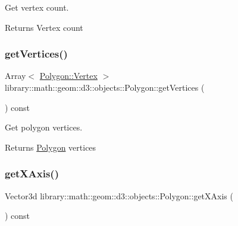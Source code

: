 Get vertex count. 

\begin{DoxyReturn}{Returns}
Vertex count 
\end{DoxyReturn}
\mbox{\label{classlibrary_1_1math_1_1geom_1_1d3_1_1objects_1_1_polygon_a6df2edc6429946ebd7b9e96524d725fa}} 
\subsubsection{\texorpdfstring{get\+Vertices()}{getVertices()}}
{\footnotesize\ttfamily Array$<$ \hyperlink{classlibrary_1_1math_1_1geom_1_1d3_1_1objects_1_1_polygon_a12c41d13f2128442c1a15b9eaa08e1d0}{Polygon\+::\+Vertex} $>$ library\+::math\+::geom\+::d3\+::objects\+::\+Polygon\+::get\+Vertices (\begin{DoxyParamCaption}{ }\end{DoxyParamCaption}) const}



Get polygon vertices. 

\begin{DoxyReturn}{Returns}
\hyperlink{classlibrary_1_1math_1_1geom_1_1d3_1_1objects_1_1_polygon}{Polygon} vertices 
\end{DoxyReturn}
\mbox{\label{classlibrary_1_1math_1_1geom_1_1d3_1_1objects_1_1_polygon_a1d16c3229601acc55e9ad25510f821e2}} 
\subsubsection{\texorpdfstring{get\+X\+Axis()}{getXAxis()}}
{\footnotesize\ttfamily Vector3d library\+::math\+::geom\+::d3\+::objects\+::\+Polygon\+::get\+X\+Axis (\begin{DoxyParamCaption}{ }\end{DoxyParamCaption}) const}



